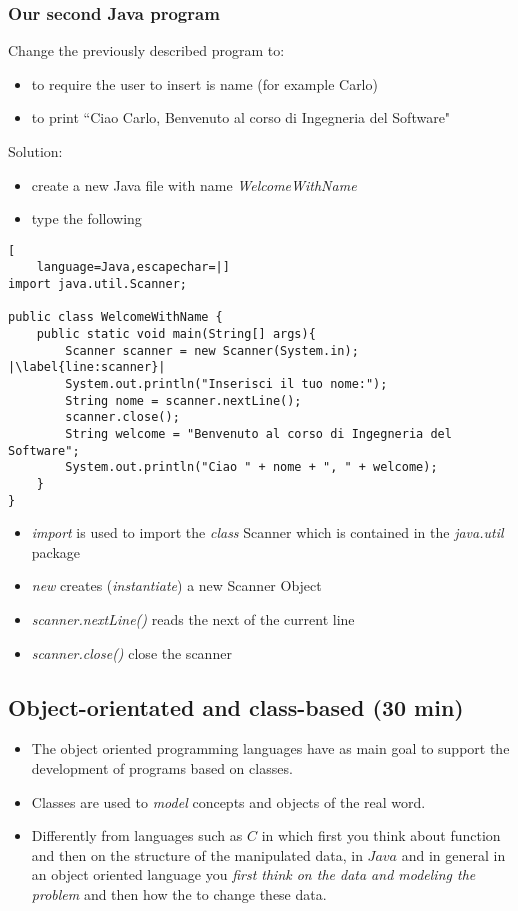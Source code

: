 \documentclass{article}
\theoremstyle{definition}
\begin{document}
\subsubsection{Our second Java program}
Change the previously described program to:
\begin{itemize}
\item to require the user to insert is name (for example Carlo)
\item to print ``Ciao Carlo, Benvenuto al corso di Ingegneria del Software" 
\end{itemize}
Solution:
\begin{itemize}
\item create a new Java file with name \emph{WelcomeWithName}
\item type the following
\end{itemize}
\begin{lstlisting}[
    language=Java,escapechar=|]
import java.util.Scanner;

public class WelcomeWithName {
	public static void main(String[] args){
		Scanner scanner = new Scanner(System.in); |\label{line:scanner}|
		System.out.println("Inserisci il tuo nome:");
		String nome = scanner.nextLine();
		scanner.close();
		String welcome = "Benvenuto al corso di Ingegneria del Software";
		System.out.println("Ciao " + nome + ", " + welcome);
	}
}
\end{lstlisting}
\begin{itemize}
\item \emph{import} is used to import the \emph{class} Scanner which is contained in the \emph{java.util} package
\item \emph{new} creates (\emph{instantiate}) a new Scanner Object
\item \emph{scanner.nextLine()} reads the next of the current line
\item \emph{scanner.close()} close the scanner
\end{itemize}


\subsection{Object-orientated and class-based (30 min)}
\begin{itemize}
\item The object oriented programming languages have as main goal to support the development of programs based on classes.
\item  Classes are used to \emph{model} concepts and objects of the real word.
\item Differently from languages such as $C$ in which first you think about function and then on the structure of the manipulated data, in $Java$ and in general in an object oriented language you \emph{first think on the data and modeling the problem} and then how the to change these data.
\end{itemize}
\end{document}
